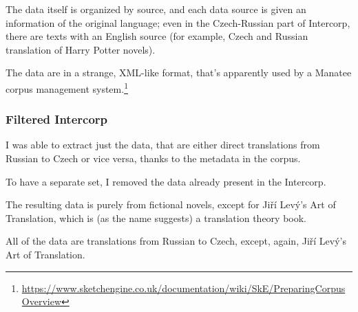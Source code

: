 The data itself is organized by source, and each data source is given an information of the original language; even in the Czech-Russian part of Intercorp, there are texts with an English source (for example, Czech and Russian translation of Harry Potter novels). 

The data are in a strange, XML-like format, that's apparently used by a Manatee corpus management system.\footnote{\url{https://www.sketchengine.co.uk/documentation/wiki/SkE/PreparingCorpusOverview}}

\subsubsection{Filtered Intercorp}
\label{corpora:filteredintercorp}
I was able to extract just the data, that are either direct translations from Russian to Czech or vice versa, thanks to the metadata in the corpus.

To have a separate set, I removed the data already present in the  Intercorp.

The resulting data is purely from fictional novels, except for Jiří Levý's Art of Translation, which is (as the name suggests) a translation theory book.

All of the data are translations from Russian to Czech, except, again, Jiří Levý's Art of Translation.

